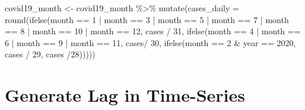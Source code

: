 \documentclass[
]{book}
\newenvironment{Shaded}{\begin{snugshade}}{\end{snugshade}}
\newcommand{\AttributeTok}[1]{\textcolor[rgb]{0.77,0.63,0.00}{#1}}
\newcommand{\DecValTok}[1]{\textcolor[rgb]{0.00,0.00,0.81}{#1}}
\newcommand{\FunctionTok}[1]{\textcolor[rgb]{0.00,0.00,0.00}{#1}}
\newcommand{\NormalTok}[1]{#1}
\newcommand{\OtherTok}[1]{\textcolor[rgb]{0.56,0.35,0.01}{#1}}
\newcommand{\SpecialCharTok}[1]{\textcolor[rgb]{0.00,0.00,0.00}{#1}}
\begin{document}
\begin{Shaded}
\begin{Highlighting}[]
\NormalTok{covid19\_month }\OtherTok{\textless{}{-}}\NormalTok{ covid19\_month }\SpecialCharTok{\%\textgreater{}\%}
  \FunctionTok{mutate}\NormalTok{(}\AttributeTok{cases\_daily =} \FunctionTok{round}\NormalTok{(}\FunctionTok{ifelse}\NormalTok{(month }\SpecialCharTok{==} \DecValTok{1} \SpecialCharTok{|}\NormalTok{ month }\SpecialCharTok{==} \DecValTok{3} \SpecialCharTok{|}\NormalTok{ month }\SpecialCharTok{==} \DecValTok{5} \SpecialCharTok{|}\NormalTok{ month }\SpecialCharTok{==} \DecValTok{7} \SpecialCharTok{|}\NormalTok{ month }\SpecialCharTok{==} \DecValTok{8} \SpecialCharTok{|}\NormalTok{ month }\SpecialCharTok{==} \DecValTok{10} \SpecialCharTok{|}\NormalTok{ month }\SpecialCharTok{==} \DecValTok{12}\NormalTok{, cases }\SpecialCharTok{/} \DecValTok{31}\NormalTok{, }\FunctionTok{ifelse}\NormalTok{(month }\SpecialCharTok{==} \DecValTok{4} \SpecialCharTok{|}\NormalTok{ month }\SpecialCharTok{==} \DecValTok{6} \SpecialCharTok{|}\NormalTok{ month }\SpecialCharTok{==} \DecValTok{9} \SpecialCharTok{|}\NormalTok{ month }\SpecialCharTok{==} \DecValTok{11}\NormalTok{, cases}\SpecialCharTok{/} \DecValTok{30}\NormalTok{, }\FunctionTok{ifelse}\NormalTok{(month }\SpecialCharTok{==} \DecValTok{2} \SpecialCharTok{\&}\NormalTok{ year }\SpecialCharTok{==} \DecValTok{2020}\NormalTok{, cases }\SpecialCharTok{/} \DecValTok{29}\NormalTok{, cases }\SpecialCharTok{/}\DecValTok{28}\NormalTok{)))))}
\end{Highlighting}
\end{Shaded}

\hypertarget{generate-lag-in-time-series}{%
\section{Generate Lag in Time-Series}\label{generate-lag-in-time-series}}
\end{document}

